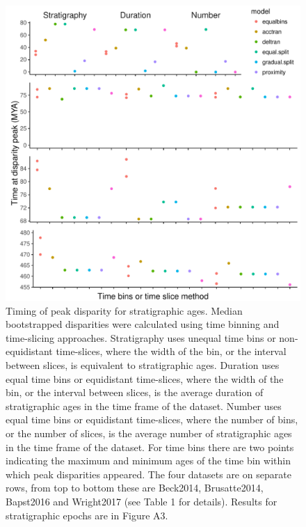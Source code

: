 \documentclass[12pt,a4paper]{article}
\begin{document}
\begin{figure}[!htbp]
    \centering
    \includegraphics[width=1\linewidth, height=1\textheight, keepaspectratio]{figures/fig-peaks-age-appendix.pdf}
    \caption[Timing of peak disparity for four example datasets.]
    {Timing of peak disparity for stratigraphic ages.
    Median bootstrapped disparities were calculated using time binning and time-slicing approaches. 
    Stratigraphy uses unequal time bins or non-equidistant time-slices, where the width of the bin, or the interval between slices, is equivalent to stratigraphic ages. 
    Duration uses equal time bins or equidistant time-slices, where the width of the bin, or the interval between slices, is the average duration of stratigraphic ages in the time frame of the dataset. 
    Number uses equal time bins or equidistant time-slices, where the number of bins, or the number of slices, is the average number of stratigraphic ages in the time frame of the dataset. 
    For time bins there are two points indicating the maximum and minimum ages of the time bin within which peak disparities appeared.
    The four datasets are on separate rows, from top to bottom these are Beck2014, Brusatte2014, Bapst2016 and Wright2017 (see Table 1 for details).
    Results for stratigraphic epochs are in Figure A3.}
    \label{figure:peak3}
  \end{figure}
\end{document}
